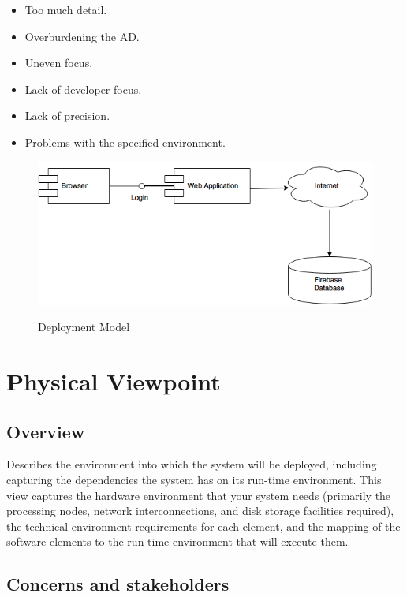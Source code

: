 \begin{itemize}
\item Too much detail.
\item Overburdening the AD.
\item Uneven focus. 
\item Lack of developer focus.
\item Lack of precision.
\item Problems with the specified environment.
\end{itemize}

\FloatBarrier

\begin{figure}[h!]
\centering
\caption{Deployment Model}
\includegraphics[width=16cm]{Deployment.png}
\label{Basic Micro-services architecture pattern}
\end{figure}

\FloatBarrier

\section{Physical Viewpoint}

\subsection{Overview}

Describes the environment into which the system will be deployed, including capturing the dependencies the system has on its run-time environment. This view captures the hardware environment that your system needs (primarily the processing nodes, network interconnections, and disk storage facilities required), the technical environment requirements for each element, and the mapping of the software elements to the run-time environment that will execute them. 

\subsection{Concerns and stakeholders}

